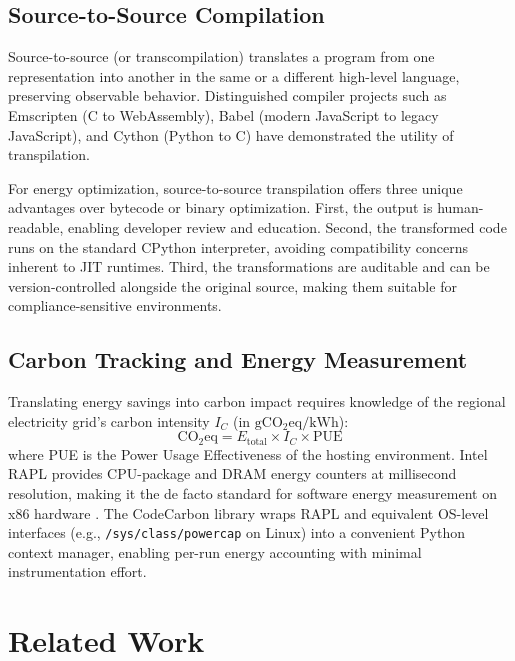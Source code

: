 \documentclass[conference]{IEEEtran}
\begin{document}
\subsection{Source-to-Source Compilation}

Source-to-source (or transcompilation) translates a program from one
representation into another in the same or a different high-level language,
preserving observable behavior.  Distinguished compiler projects such as
Emscripten (C to WebAssembly), Babel (modern JavaScript to legacy JavaScript),
and Cython (Python to C) have demonstrated the utility of transpilation.

For energy optimization, source-to-source transpilation offers three unique
advantages over bytecode or binary optimization.  First, the output is
human-readable, enabling developer review and education.  Second, the
transformed code runs on the standard CPython interpreter, avoiding
compatibility concerns inherent to JIT runtimes.  Third, the transformations
are auditable and can be version-controlled alongside the original source,
making them suitable for compliance-sensitive environments.

\subsection{Carbon Tracking and Energy Measurement}

Translating energy savings into carbon impact requires knowledge of the
regional electricity grid's carbon intensity $I_C$ (in $\mathrm{gCO_2eq/kWh}$):
\begin{equation}
  \mathrm{CO_2eq} = E_{\text{total}} \times I_C \times \mathrm{PUE}
  \label{eq:carbon}
\end{equation}
where PUE is the Power Usage Effectiveness of the hosting environment.  Intel
RAPL provides CPU-package and DRAM energy counters at millisecond resolution,
making it the de facto standard for software energy measurement on x86
hardware \cite{ref9}.  The CodeCarbon library wraps RAPL and equivalent
OS-level interfaces (e.g., \texttt{/sys/class/powercap} on Linux) into a
convenient Python context manager, enabling per-run energy accounting with
minimal instrumentation effort.

\section{Related Work}
\end{document}
